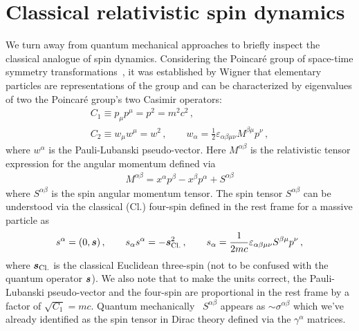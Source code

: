\section{Classical relativistic spin dynamics}
\label{sec:cspin}
\noindent We turn away from quantum mechanical approaches to briefly inspect the classical analogue of spin dynamics. Considering the Poincar{\'e} group of space-time symmetry
transformations~\citep{Weinberg:1995mt,greiner2012quantum}, it was established by Wigner that elementary particles are representations of the group and can be characterized by eigenvalues of two the Poincar{\'e} group's two Casimir operators:
\begin{gather}
    C_{1}\equiv p_{\mu}p^{\mu} = p^{2} = m^{2}c^{2}\,,\\
    C_{2}\equiv w_{\mu}w^{\mu} = w^{2}\,,\qquad w_{\alpha}=\frac{1}{2}\varepsilon_{\alpha\beta\mu\nu}M^{\beta\mu}p^{\nu}\,,
\end{gather}
where $w^{\alpha}$ is the Pauli-Lubanski pseudo-vector. Here $M^{\alpha\beta}$ is the relativistic tensor expression for the angular momentum defined via
\begin{gather}
    M^{\alpha\beta} = x^{\alpha}p^{\beta}-x^{\beta}p^{\alpha} + S^{\alpha\beta}
\end{gather}
where $S^{\alpha\beta}$ is the spin angular momentum tensor. The spin tensor $S^{\alpha\beta}$ can be understood via the classical (Cl.) four-spin defined in the rest frame for a massive particle as
\begin{gather}
    s^{\alpha} = (0,\boldsymbol{s})\,,\qquad s_{\alpha}s^{\alpha} = -\boldsymbol{s}_\mathrm{Cl.}^{2}\,,\qquad s_{\alpha} = \frac{1}{2mc}\varepsilon_{\alpha\beta\mu\nu}S^{\beta\mu}p^{\nu}\,,
\end{gather}
where $\boldsymbol{s}_\mathrm{Cl.}$ is the classical Euclidean three-spin (not to be confused with the quantum operator $\boldsymbol{s}$). We also note that to make the units correct, the Pauli-Lubanski pseudo-vector and the four-spin are proportional in the rest frame by a factor of $\sqrt{C_{1}}=mc$. Quantum mechanically~\citep{Ohlsson:2011zz} $S^{\alpha\beta}$ appears as $\sim\sigma^{\alpha\beta}$ which we've already identified as the spin tensor in Dirac theory defined via the $\gamma^{\alpha}$ matrices.


